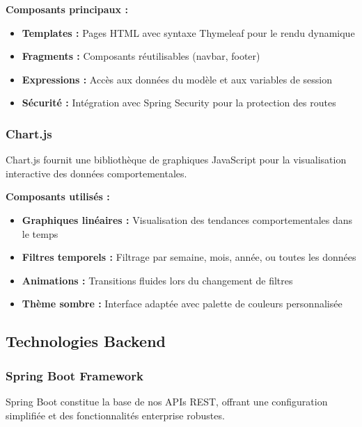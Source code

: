 \textbf{Composants principaux :}
\begin{itemize}
    \item \textbf{Templates :} Pages HTML avec syntaxe Thymeleaf pour le rendu dynamique
    \item \textbf{Fragments :} Composants réutilisables (navbar, footer)
    \item \textbf{Expressions :} Accès aux données du modèle et aux variables de session
    \item \textbf{Sécurité :} Intégration avec Spring Security pour la protection des routes
\end{itemize}

\subsubsection{Chart.js}

Chart.js fournit une bibliothèque de graphiques JavaScript pour la visualisation interactive des données comportementales.

\textbf{Composants utilisés :}
\begin{itemize}
    \item \textbf{Graphiques linéaires :} Visualisation des tendances comportementales dans le temps
    \item \textbf{Filtres temporels :} Filtrage par semaine, mois, année, ou toutes les données
    \item \textbf{Animations :} Transitions fluides lors du changement de filtres
    \item \textbf{Thème sombre :} Interface adaptée avec palette de couleurs personnalisée
\end{itemize}

\subsection{Technologies Backend}

\subsubsection{Spring Boot Framework}

Spring Boot constitue la base de nos APIs REST, offrant une configuration simplifiée et des fonctionnalités enterprise robustes.

